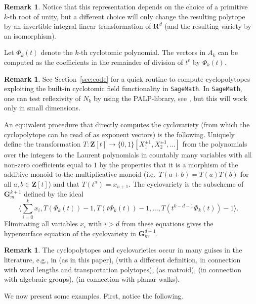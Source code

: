 \documentclass[12pt,reqno]{amsart}
\theoremstyle{definition}
\theoremstyle{plain}
\theoremstyle{definition}
\newtheorem{remark}[theorem]{Remark}
\newcommand{\Z}{\mathbf{Z}}
\newcommand{\R}{\mathbf{R}}
\newcommand{\Gm}{\mathbf{G}_m}
\begin{document}
\begin{remark} Notice that this representation depends on the choice of a primitive $k$-th root of unity, but a different choice will only change the resulting polytope by an invertible integral linear transformation of $\R^d$ (and the resulting variety by an isomorphism). 
\end{remark} 

Let $\Phi_k(t)$ denote the $k$-th cyclotomic polynomial. The vectors in $A_k$ can be computed as the coefficients in the remainder of division of $t^r$ by $\Phi_k(t)$.


\begin{remark} \label{algocycsage} See Section~\ref{sec:code} for a quick routine to compute cyclopolytopes exploiting the built-in cyclotomic field functionality in \texttt{SageMath}. 
In \texttt{SageMath}, one can test reflexivity of $N_k$ by using the PALP-library, see \cite{PALP}, but this will work only in small dimensions. 
\end{remark} 

 An equivalent procedure that directly computes the cyclovariety (from which the cyclopolytope can be read of as exponent vectors) is the following. Uniquely define the transformation $T \colon \Z[t] \rightarrow \{0,1\}[X_1^{\pm 1}, X_2^{\pm 1}, \dots]$ from the polynomials over the integers to the Laurent polynomials in countably many variables with all non-zero coefficients equal to $1$ by 
the properties that  it is a morphism of the additive monoid to the multiplicative monoid (i.e.\ $T(a+b)=T(a)T(b)$ for all $a,b \in \Z[t]$) and that  
$T(t^n)=x_{n+1}$. 
The cyclovariety is the subscheme of $\Gm^{k+1}$ defined by the ideal $$ \langle \sum_{i=0}^{k} x_i, T(\Phi_k(t))-1,T(t\Phi_k(t))-1,\dots, T(t^{k-d-1}\Phi_k(t))-1 \rangle.$$ Eliminating all variables $x_i$ with $i>d$ from these equations gives the hypersurface equation of the cyclovariety in $\Gm^{d+1}$. 


\begin{remark} 
The cyclopolytopes and cyclovarieties occur in many guises in the literature, e.g., in \cite{Myerson} (as in this paper), \cite{BeckHosten} (with a different definition, in connection with word lengths and transportation polytopes), \cite{Reiner} (as matroid), \cite{KlyachkoVoskresenskii} (in connection with algebraic groups), \cite{Lala} (in connection with planar walks). 
\end{remark} 

We now present some examples. First, notice the following. 
\end{document}
